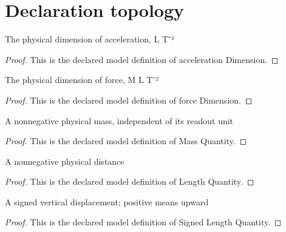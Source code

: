 \section{Declaration topology}
\begin{definition}
  \label{def:physics:phyx-mini-0803:phyxminiproblems-problemphyxmini0803-accelerationdimension}
  The physical dimension of acceleration, L T⁻²
\end{definition}
\begin{proof}
  This is the declared model definition of acceleration Dimension.
\end{proof}
\begin{definition}
  \label{def:physics:phyx-mini-0803:phyxminiproblems-problemphyxmini0803-forcedimension}
  The physical dimension of force, M L T⁻²
\end{definition}
\begin{proof}
  This is the declared model definition of force Dimension.
\end{proof}
\begin{definition}
  \label{def:physics:phyx-mini-0803:phyxminiproblems-problemphyxmini0803-massquantity}
  A nonnegative physical mass, independent of its readout unit
\end{definition}
\begin{proof}
  This is the declared model definition of Mass Quantity.
\end{proof}
\begin{definition}
  \label{def:physics:phyx-mini-0803:phyxminiproblems-problemphyxmini0803-lengthquantity}
  A nonnegative physical distance
\end{definition}
\begin{proof}
  This is the declared model definition of Length Quantity.
\end{proof}
\begin{definition}
  \label{def:physics:phyx-mini-0803:phyxminiproblems-problemphyxmini0803-signedlengthquantity}
  A signed vertical displacement; positive means upward
\end{definition}
\begin{proof}
  This is the declared model definition of Signed Length Quantity.
\end{proof}
